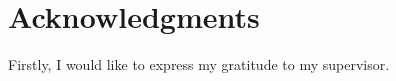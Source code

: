 
\section*{Acknowledgments}

Firstly, I would like to express my gratitude to my supervisor.

\vspace{2.5cm}